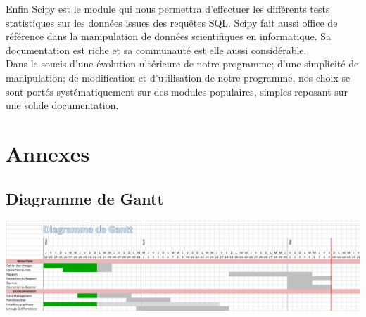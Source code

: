\documentclass[a4paper]{report}
\begin{document}
Enfin Scipy est le module qui nous permettra d'effectuer les différents tests statistiques sur les données issues des requêtes SQL. Scipy fait aussi office de référence dans la manipulation de données scientifiques en informatique. Sa documentation est riche et sa communauté est elle aussi considérable.\\

Dans le soucis d'une évolution ultérieure de notre programme; d'une simplicité de manipulation; de modification et d'utilisation de notre programme, nos choix se sont portés systématiquement sur des modules populaires, simples reposant sur une solide documentation.


\section{Annexes}

\subsection{Diagramme de Gantt}

\vspace{15pt}

\begin{center}
\includegraphics[width=15cm]{D_Gantt_II.png}
\end{center}
\end{document}
